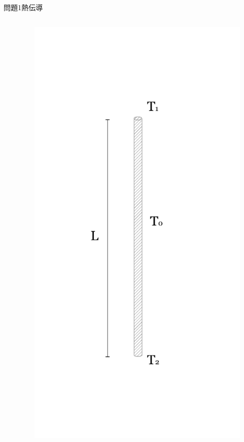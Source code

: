 \documentclass[dvipdfmx]{beamer}
\begin{document}
\begin{frame}{問題1}{熱伝導}
\begin{columns}[t]
\begin{column}{0.7\textwidth}
\end{column}
\begin{column}{0.3\textwidth}
\begin{figure}[htbp]
    \centering
    \includegraphics[bb=0mm 0mm 100.0mm 170.0mm, scale=0.35, type=pdf]{img/problem1.pdf}
\end{figure}
\end{column}
\end{columns}
\end{frame}
\end{document}
